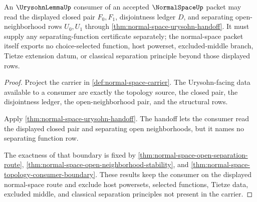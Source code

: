 \begin{theorem}
\label{thm:normal-space-urysohn-lemma-consumer-exactness}
An $\UrysohnLemmaUp$ consumer of an accepted $\NormalSpaceUp$ packet may read the displayed closed pair $F_0,F_1$, disjointness ledger $D$, and separating open-neighborhood rows $U_0,U_1$ through \autoref{thm:normal-space-urysohn-handoff}. It must supply any separating-function certificate separately; the normal-space packet itself exports no choice-selected function, host powerset, excluded-middle branch, Tietze extension datum, or classical separation principle beyond those displayed rows.
\end{theorem}
\begin{proof}
Project the carrier in \autoref{def:normal-space-carrier}. The Urysohn-facing data available to a consumer are exactly the topology source, the closed pair, the disjointness ledger, the open-neighborhood pair, and the structural rows.

Apply \autoref{thm:normal-space-urysohn-handoff}. The handoff lets the consumer read the displayed closed pair and separating open neighborhoods, but it names no separating function row.

The exactness of that boundary is fixed by \autoref{thm:normal-space-open-separation-route}, \autoref{thm:normal-space-open-neighborhood-stability}, and \autoref{thm:normal-space-topology-consumer-boundary}. These results keep the consumer on the displayed normal-space route and exclude host powersets, selected functions, Tietze data, excluded middle, and classical separation principles not present in the carrier.
\end{proof}

